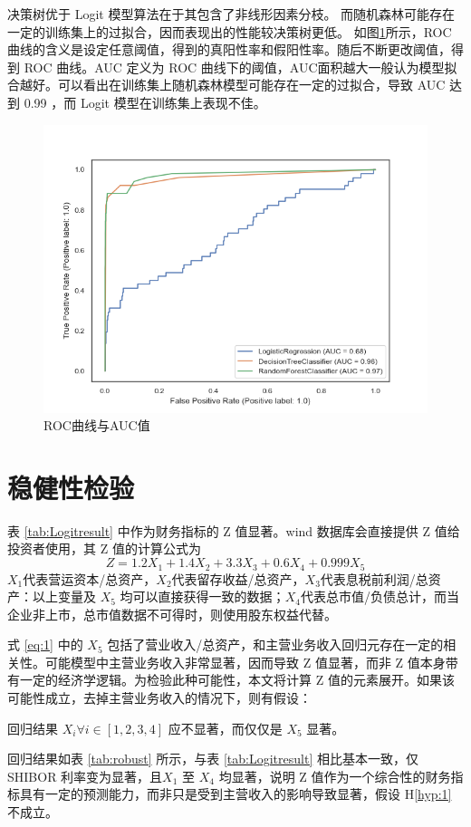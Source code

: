 决策树优于 Logit 模型算法在于其包含了非线形因素分枝。
而随机森林可能存在一定的训练集上的过拟合，因而表现出的性能较决策树更低。
如图\ref{fig:roc}所示，ROC 曲线的含义是设定任意阈值，得到的真阳性率和假阳性率。随后不断更改阈值，得到 ROC 曲线。AUC 定义为 ROC 曲线下的阈值，AUC面积越大一般认为模型拟合越好。可以看出在训练集上随机森林模型可能存在一定的过拟合，导致 AUC 达到 0.99 ，而 Logit 模型在训练集上表现不佳。
\begin{figure}[h]
	\centering
	\includegraphics[width=.9\linewidth]{./data/roc.png}
	\caption{\label{fig:roc}ROC曲线与AUC值}
\end{figure}

\section{稳健性检验}
表 \ref{tab:Logitresult} 中作为财务指标的 Z 值显著。wind 数据库会直接提供 Z 值给投资者使用，其 Z 值的计算公式为
\begin{equation}
	\label{eq:1}
	Z=1.2X_1+1.4X_2+3.3X_3+0.6X_4+0.999X_5
\end{equation}
\(X_1\)代表营运资本/总资产，\(X_2\)代表留存收益/总资产，\(X_3\)代表息税前利润/总资产：以上变量及 \(X_5\) 均可以直接获得一致的数据；\(X_4\)代表总市值/负债总计，而当企业非上市，总市值数据不可得时，则使用股东权益代替。

式 \ref{eq:1} 中的 \(X_{5}\) 包括了营业收入/总资产，和主营业务收入回归元存在一定的相关性。可能模型中主营业务收入非常显著，因而导致 Z 值显著，而非 Z 值本身带有一定的经济学逻辑。为检验此种可能性，本文将计算 Z 值的元素展开。如果该可能性成立，去掉主营业务收入的情况下，则有假设：

\begin{hyp}
	\label{hyp:1}
	回归结果 \(X_i\forall i\in [1,2,3,4] \) 应不显著，而仅仅是 \(X_5\) 显著。
\end{hyp}


回归结果如表
\ref{tab:robust}
所示，与表 \ref{tab:Logitresult} 相比基本一致，仅 SHIBOR 利率变为显著，且\(X_1\) 至 \(X_4\) 均显著，说明 Z 值作为一个综合性的财务指标具有一定的预测能力，而非只是受到主营收入的影响导致显著，假设 H\ref{hyp:1}不成立。

